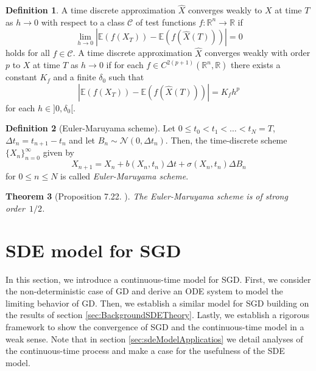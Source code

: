 \documentclass[12pt]{article}
\newtheorem{theorem}{Theorem}[section]
\theoremstyle{definition}
\newtheorem{definition}[theorem]{Definition}
\numberwithin{equation}{section}
\newcommand{\CN}{\mathcal{N}}
\begin{document}
\begin{definition}
  A time discrete approximation $\widehat{X}$ converges weakly to $X$ at time $T$ as $h \rightarrow 0$ with respect to a class $\mathcal{C}$ of test functions $f: \mathbb{R}^n \rightarrow \mathbb{R}$ if 
  \begin{equation}
    \lim_{h \rightarrow 0} |\mathbb{E}(f(X_T)) - \mathbb{E}(f(\widehat{X}(T)))| = 0
  \end{equation}
  holds for all $f \in \mathcal{C}$.
  A time discrete approximation $\widehat{X}$ converges weakly with order $p$ to $X$ at time $T$ as $h \rightarrow 0$ if for each $f \in C^{2(p+1)}(\mathbb{R}^n, \mathbb{R})$ there exists a constant $K_f$ and a finite $\delta_0$ such that 
  \begin{equation}
     |\mathbb{E}(f(X_T)) - \mathbb{E}(f(\widehat{X}(T)))| = K_f h^p
  \end{equation}
  for each $h \in ]0, \delta_0[$.
\end{definition}
\begin{definition}[Euler-Maruyama scheme]
  Let $0 \leq t_0 < t_1 < \dots < t_N = T$, $\Delta t_n = t_{n+1} - t_n$ and let $B_n \sim \CN(0,\Delta t_n)$. Then, the time-discrete scheme $\{X_n\}_{n=0}^\infty$ given by
\begin{equation}
  \label{eq:euler_maruyama}
  X_{n+1} = X_n + b(X_n, t_n)\Delta t + \sigma(X_n, t_n) \Delta B_n
\end{equation}
for $0 \leq n \leq N$ is called \emph{Euler-Maruyama scheme}.
\end{definition}

\begin{theorem}[Proposition 7.22. ]
  The Euler-Maruyama scheme is of strong order~$1/2$.
\end{theorem}
\section{SDE model for SGD}
\label{sec:sde_model}
In this section, we introduce a continuous-time model for SGD. First, we consider the non-deterministic case of GD and derive an ODE system to model the limiting behavior of GD. Then, we establish a similar model for SGD building on the results of section \ref{sec:BackgroundSDETheory}. Lastly, we establish a rigorous framework to show the convergence of SGD and the continuous-time model in a weak sense.
Note that in section \ref{sec:sdeModelApplicatios} we detail analyses of the continuous-time process and make a case for the usefulness of the SDE model.
\end{document}
